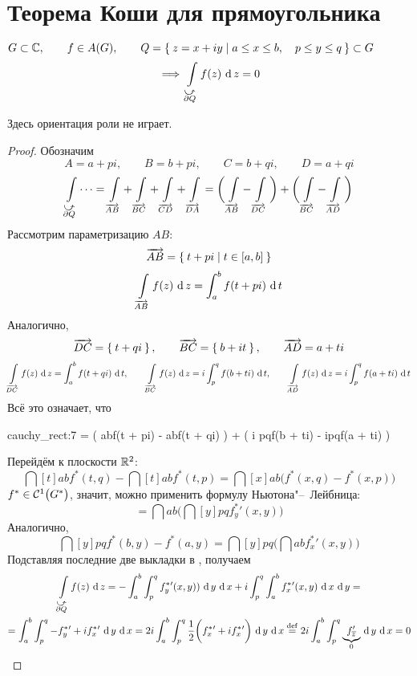 \section{Теорема Коши для прямоугольника}

\begin{theorem}
	$ G \sub \Co, \qquad f \in A(G), \qquad Q = \set{z = x + iy \mid a \le x \le b, \quad p \le y \le q} \sub G $
	$$ \implies \cint[z]{\curvedir{\partial Q}}{f(z)} = 0 $$
\end{theorem}

\begin{note}
	Здесь ориентация роли не играет.
\end{note}

\begin{proof}
	Обозначим
	$$ A = a + pi, \qquad B = b + pi, \qquad C = b + qi, \qquad D = a + qi $$
	$$ \int\limits_{\curvedir{\partial Q}}\dots = \int\limits_{\overrightarrow{AB}} + \int\limits_{\overrightarrow{BC}} + \int\limits_{\overrightarrow{CD}} + \int\limits_{\overrightarrow{DA}} = \bigg( \int\limits_{\overrightarrow{AB}} - \int\limits_{\overrightarrow{DC}} \bigg) + \bigg( \int\limits_{\overrightarrow{BC}} - \int\limits_{\overrightarrow{AD}} \bigg) $$
	Рассмотрим параметризацию $ AB $:
	$$ \overrightarrow{AB} = \set{t + pi \mid t \in [a, b]} $$
	$$ \cint[z]{\overrightarrow{AB}}{f(z)} = \dint[t]ab{f(t + pi)} $$
	Аналогично,
	$$ \overrightarrow{DC} = \set{t + qi}, \qquad \overrightarrow{BC} = \set{b + it}, \qquad \overrightarrow{AD} = {a + ti} $$
	$$ \cint[z]{\overrightarrow{DC}}{f(z)} = \dint[t]ab{f(t + qi)}, \qquad \cint[z]{\overrightarrow{BC}}{f(z)} = i\dint[t]pq{f(b + ti)}, \qquad \cint[z]{\overrightarrow{AD}}{f(z)} = i\dint[t]pq{f(a + ti)} $$
	Всё это означает, что
	\begin{equ}{cauchy_rect:7}
		 = \bigg( \dint[t]ab{f(t + pi)} - \dint[t]ab{f(t + qi)} \bigg) + \bigg( i \dint[t]pq{f(b + ti)} - i\dint[t]pq{f(a + ti)} \bigg)
	\end{equ}
	Перейдём к плоскости $ \R^2 $:
	$$ \dint[t]ab{f^*(t, q)} - \dint[t]ab{f^*(t, p)} = \dint[x]ab{ \bigg( f^*(x, q) - f^*(x, p) \bigg) } $$
	$ f^* \in \Cont[1]{G^*} $, значит, можно применить формулу Ньютона"--~Лейбница:
	$$ = \dint ab{ \bigg( \dint[y]pq{f_y^*{}'(x, y)} \bigg)} $$
	Аналогично,
	$$ \dint[y]pq{f^*(b, y) - f^*(a, y)} = \dint[y]pq{ \bigg( \dint ab{f_x^*{}'(x, y)} \bigg) } $$
	Подставляя последние две выкладки в , получаем
	\begin{multline*}
		\cint[z]{\curvedir{\partial Q}}{f(z)} = -\dint ab{ \dint[y]pq{ f_y^*{}'(x, y))}} + i \dint[y]pq{ \dint ab{f_x^*{}'(x, y)}} = \\
		= \dint ab{ \dint[y]pq{ -f_y^*{}' + if_x^*{}'}} = 2i \dint ab{ \dint[y]pq {\frac12 \bigg( f_x^*{}' + if_x^*{}' \bigg)}} \bydef 2i \dint ab { \dint[y]pq{ \underbrace{f_{\ol z}'}_0}} = 0
	\end{multline*}
\end{proof}


